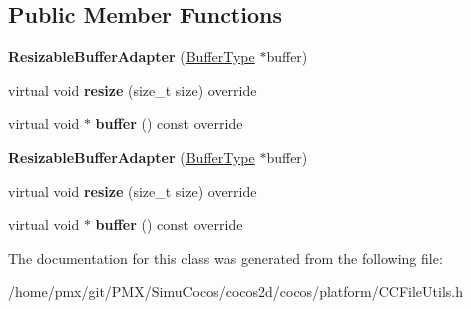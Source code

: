 \subsection*{Public Member Functions}
\begin{DoxyCompactItemize}
\item 
\mbox{\label{classResizableBufferAdapter_3_01Data_01_4_adfa729c27c6dc7b99341fbfc8a1203eb}} 
{\bfseries Resizable\+Buffer\+Adapter} (\hyperlink{classData}{Buffer\+Type} $\ast$buffer)
\item 
\mbox{\label{classResizableBufferAdapter_3_01Data_01_4_a7b14fcfe1eba4586e17c5b026a06d0c2}} 
virtual void {\bfseries resize} (size\+\_\+t size) override
\item 
\mbox{\label{classResizableBufferAdapter_3_01Data_01_4_a0066675b67316e282aa518a480b0547b}} 
virtual void $\ast$ {\bfseries buffer} () const override
\item 
\mbox{\label{classResizableBufferAdapter_3_01Data_01_4_adfa729c27c6dc7b99341fbfc8a1203eb}} 
{\bfseries Resizable\+Buffer\+Adapter} (\hyperlink{classData}{Buffer\+Type} $\ast$buffer)
\item 
\mbox{\label{classResizableBufferAdapter_3_01Data_01_4_a7b14fcfe1eba4586e17c5b026a06d0c2}} 
virtual void {\bfseries resize} (size\+\_\+t size) override
\item 
\mbox{\label{classResizableBufferAdapter_3_01Data_01_4_a0066675b67316e282aa518a480b0547b}} 
virtual void $\ast$ {\bfseries buffer} () const override
\end{DoxyCompactItemize}


The documentation for this class was generated from the following file\+:\begin{DoxyCompactItemize}
\item 
/home/pmx/git/\+P\+M\+X/\+Simu\+Cocos/cocos2d/cocos/platform/C\+C\+File\+Utils.\+h\end{DoxyCompactItemize}
